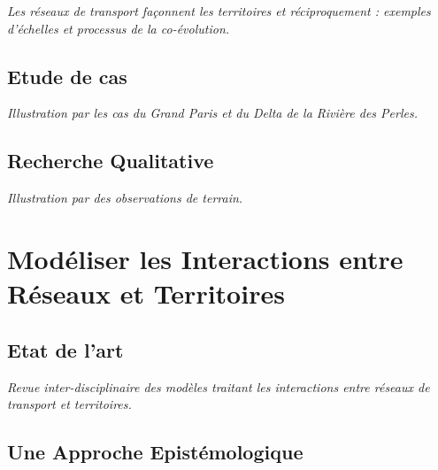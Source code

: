 
\textit{Les réseaux de transport façonnent les territoires et réciproquement : exemples d'échelles et processus de la co-évolution.}

\subsection{Etude de cas}

\textit{Illustration par les cas du Grand Paris et du Delta de la Rivière des Perles.} 


\subsection{Recherche Qualitative}

\textit{Illustration par des observations de terrain.}



\section{Modéliser les Interactions entre Réseaux et Territoires}


\subsection{Etat de l'art}

\textit{Revue inter-disciplinaire des modèles traitant les interactions entre réseaux de transport et territoires.}


\subsection{Une Approche Epistémologique}




